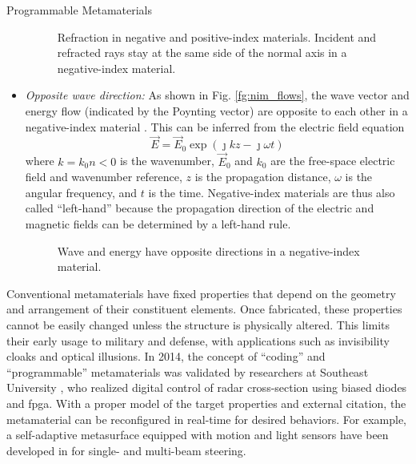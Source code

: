 \begin{section}{}
\begin{subsection}{Programmable Metamaterials}
\begin{itemize}
\begin{figure}[H]
{					\resizebox{0.45\columnwidth}{!}{
						
					}
				}
				\caption{Refraction in negative and positive-index materials. Incident and refracted rays stay at the same side of the normal axis in a negative-index material.}
			\end{figure}
			\item \emph{Opposite wave direction:} As shown in Fig. \ref{fg:nim_flows}, the wave vector and energy flow (indicated by the Poynting vector) are opposite to each other in a negative-index material \cite{Pendry2004}. This can be inferred from the electric field equation
			\begin{equation}
				\vec{E} = \vec{E}_0 \exp(\jmath k z - \jmath \omega t)
			\end{equation}
			where $k = k_0 n < 0$ is the wavenumber, $\vec{E}_0$ and $k_0$ are the free-space electric field and wavenumber reference, $z$ is the propagation distance, $\omega$ is the angular frequency, and $t$ is the time.
			Negative-index materials are thus also called ``left-hand'' because the propagation direction of the electric and magnetic fields can be determined by a left-hand rule.
			\begin{figure}[H]
				\centering
				\caption{Wave and energy have opposite directions in a negative-index material.}
			\end{figure}
		\end{itemize}

		Conventional metamaterials have fixed properties that depend on the geometry and arrangement of their constituent elements.
		Once fabricated, these properties cannot be easily changed unless the structure is physically altered.
		This limits their early usage to military and defense, with applications such as invisibility cloaks and optical illusions.
		In 2014, the concept of ``coding'' and ``programmable'' metamaterials was validated by researchers at Southeast University \cite{Cui2014}, who realized digital control of radar cross-section using biased diodes and \gls{fpga}.
		With a proper model of the target properties and external citation, the metamaterial can be reconfigured in real-time for desired behaviors.
		For example, a self-adaptive metasurface equipped with motion and light sensors have been developed in \cite{Ma2019} for single- and multi-beam steering.


\end{subsection}
\end{section}
